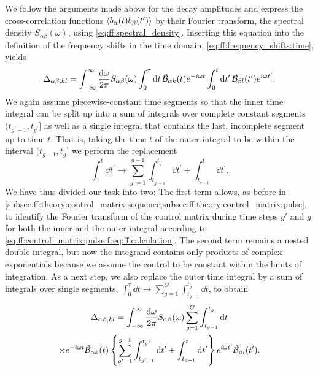 We follow the arguments made above for the decay amplitudes and express the cross-correlation functions $\ev{b_\alpha(t) b_\beta(t^\prime)}$ by their Fourier transform, the spectral density $S_{\alpha\beta}(\omega)$, using \cref{eq:ff:spectral_density}.
Inserting this equation into the definition of the frequency shifts in the time domain, \cref{eq:ff:frequency_shifts:time}, yields
\begin{equation}
    \Delta_{\alpha\beta,kl} = \int_{-\infty}^\infty\frac{\dd{\omega}}{2\pi} S_{\alpha\beta}(\omega)
        \int_0^\tau\dd{t}\tilde{\mathcal{B}}_{\alpha k}(t)e^{-i\omega t}
        \int_0^t\dd{t^\prime}\tilde{\mathcal{B}}_{\beta l}(t^\prime)e^{i\omega t^\prime}.
\end{equation}
We again assume piecewise-constant time segments so that the inner time integral can be split up into a sum of integrals over complete constant segments $(t_{g^\prime-1},t_{g^\prime}]$ as well as a single integral that contains the last, incomplete segment up to time $t$.
That is, taking the time $t$ of the outer integral to be within the interval $(t_{g-1}, t_g]$ we perform the replacement
\begin{equation}
    \int_0^t\dd{t^\prime} \rightarrow \sum_{g^\prime=1}^{g-1}\int_{t_{g^\prime-1}}^{t_{g^\prime}}\dd{t^\prime} + \int_{t_{g-1}}^{t}\dd{t^\prime}.
\end{equation}
We have thus divided our task into two: The first term allows, as before in \cref{subsec:ff:theory:control_matrix:sequence,subsec:ff:theory:control_matrix:pulse}, to identify the Fourier transform of the control matrix during time steps $g'$ and $g$ for both the inner and the outer integral according to \cref{eq:ff:control_matrix:pulse:freq:ff:calculation}.
The second term remains a nested double integral, but now the integrand contains only products of complex exponentials because we assume the control to be constant within the limits of integration.
As a next step, we also replace the outer time integral by a sum of integrals over single segments, $\int_0^\tau\dd{t}\rightarrow\sum_{g=1}^G\int_{t_{g-1}}^{t_g}\dd{t}$, to obtain
\begin{multline}\label{eq:ff:frequency_shifts:time:substituted}
    \Delta_{\alpha\beta,kl} = \int_{-\infty}^\infty\frac{\dd{\omega}}{2\pi} S_{\alpha\beta}(\omega)
        \sum_{g=1}^{G}\int_{t_{g-1}}^{t_{g}}\dd{t} \\
        \times e^{-i\omega t}\tilde{\mathcal{B}}_{\alpha k}(t)
        \left\lbrace\sum_{g^\prime=1}^{g-1}\int_{t_{g^\prime-1}}^{t_{g^\prime}}\dd{t^\prime} + \int_{t_{g-1}}^{t}\dd{t^\prime}\right\rbrace
        e^{i\omega t^\prime}\tilde{\mathcal{B}}_{\beta l}(t').
\end{multline}
